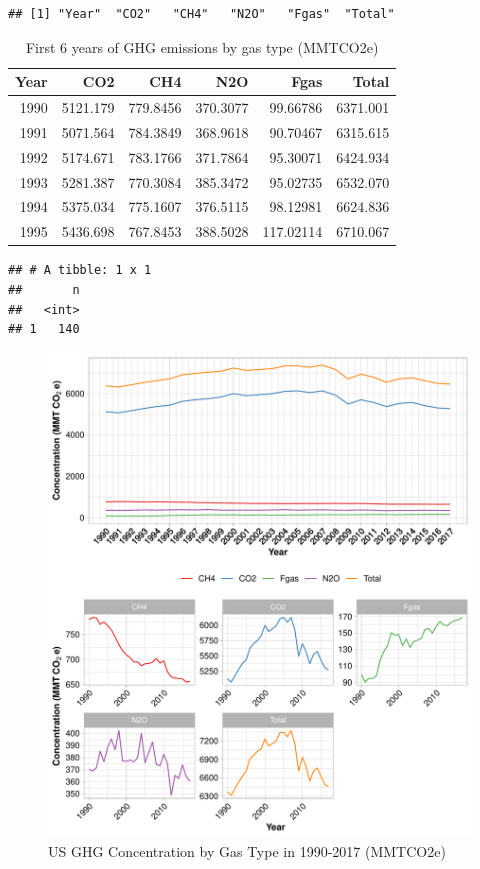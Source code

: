 \documentclass[12pt,]{article}
\begin{document}
\begin{verbatim}
## [1] "Year"  "CO2"   "CH4"   "N2O"   "Fgas"  "Total"
\end{verbatim}

\begin{table}[!h]

\caption{\label{tab:unnamed-chunk-7}First 6 years of GHG emissions by gas type (MMTCO2e)}
\centering
\begin{tabular}{r|r|r|r|r|r}
\hline
Year & CO2 & CH4 & N2O & Fgas & Total\\
\hline
1990 & 5121.179 & 779.8456 & 370.3077 & 99.66786 & 6371.001\\
\hline
1991 & 5071.564 & 784.3849 & 368.9618 & 90.70467 & 6315.615\\
\hline
1992 & 5174.671 & 783.1766 & 371.7864 & 95.30071 & 6424.934\\
\hline
1993 & 5281.387 & 770.3084 & 385.3472 & 95.02735 & 6532.070\\
\hline
1994 & 5375.034 & 775.1607 & 376.5115 & 98.12981 & 6624.836\\
\hline
1995 & 5436.698 & 767.8453 & 388.5028 & 117.02114 & 6710.067\\
\hline
\end{tabular}
\end{table}

\begin{verbatim}
## # A tibble: 1 x 1
##       n
##   <int>
## 1   140
\end{verbatim}

\begin{figure}
\centering
\includegraphics{Project_Code_files/figure-latex/unnamed-chunk-7-1.pdf}
\caption{US GHG Concentration by Gas Type in 1990-2017 (MMTCO2e)}
\end{figure}
\end{document}
